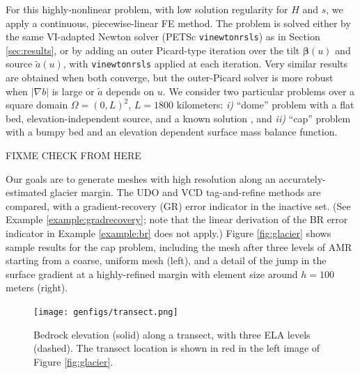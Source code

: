 \documentclass[]{interact}
\theoremstyle{plain}%
\theoremstyle{definition}
\theoremstyle{remark}
\newcommand{\grad}{\nabla}
\begin{document}
For this highly-nonlinear problem, with low solution regularity for $H$ and $s$, we apply a continuous, piecewise-linear FE method.  The problem is solved either by the same VI-adapted Newton solver (PETSc \texttt{vinewtonrsls}) as in Section \ref{sec:results}, or by adding an outer Picard-type iteration over the tilt $\bm{\beta}(u)$ \cite{JouvetBueler2012} and source $\tilde a(u)$, with \texttt{vinewtonrsls} applied at each iteration.  Very similar results are obtained when both converge, but the outer-Picard solver is more robust when $|\grad b|$ is large or $\tilde a$ depends on $u$.  We consider two particular problems over a square domain $\Omega=(0,L)^2$, $L=1800$ kilometers: \emph{i)} ``dome'' problem with a flat bed, elevation-independent source, and a known solution \cite{Bueler2016}, and \emph{ii)} ``cap'' problem with a bumpy bed \cite[Example 8.4]{BuelerFarrell2024} and an elevation dependent surface mass balance function.

FIXME CHECK FROM HERE

Our goals are to generate meshes with high resolution along an accurately-estimated glacier margin.  The UDO and VCD tag-and-refine methods are compared, with a gradient-recovery (GR) error indicator in the inactive set.  (See Example \ref{example:gradrecovery}; note that the linear derivation of the BR error indicator in Example \ref{example:br} does not apply.)  Figure \ref{fig:glacier} shows sample results for the cap problem, including the mesh after three levels of AMR starting from a coarse, uniform mesh (left), and a detail of the jump in the surface gradient at a highly-refined margin with element size around $h = 100$ meters (right).

\begin{figure}[ht]
\centering
\medskip

\texttt{[image: genfigs/transect.png]}
\caption{Bedrock elevation (solid) along a transect, with three ELA levels (dashed).  The transect location is shown in red in the left image of Figure \ref{fig:glacier}.}
\label{fig:transect}
\end{figure}
\end{document}

